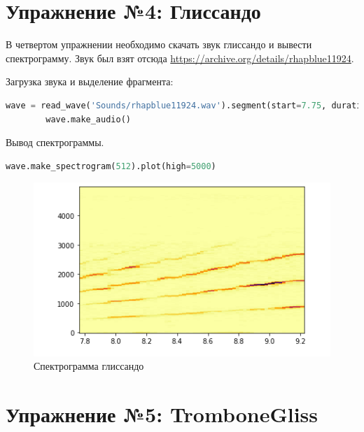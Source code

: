 \documentclass[a4paper, 14pt]{extarticle}
\begin{document}
    \newpage


    \section{Упражнение №4: Глиссандо}
    \label{sec:4_glist}

    В четвертом упражнении необходимо скачать звук глиссандо и вывести спектрограмму.
    Звук был взят отсюда \href{https://archive.org/details/rhapblue11924}{https://archive.org/details/rhapblue11924}.

    Загрузка звука и выделение фрагмента:

    \begin{lstlisting}[language=Python, caption= Загрузка звука и выделения фрагмента, label={lst:load_wav_segment}]
        wave = read_wave('Sounds/rhapblue11924.wav').segment(start=7.75, duration=1.5)
        wave.make_audio()
    \end{lstlisting}

    Вывод спектрограммы.

    \begin{lstlisting}[language=Python, caption= Создание и вывод на экран треугольного сигнала, label={lst:print_spectrogram}]
        wave.make_spectrogram(512).plot(high=5000)
    \end{lstlisting}

    \begin{figure}[H]
        \centering
        \includegraphics[width=0.8\linewidth]{glist_spectrogram}
        \caption{Спектрограмма глиссандо}
        \label{fig:glist_spectrogram}
    \end{figure}

    \newpage


    \section{Упражнение №5: TromboneGliss}
    \label{sec:5_trombone_gliss}
\end{document}
